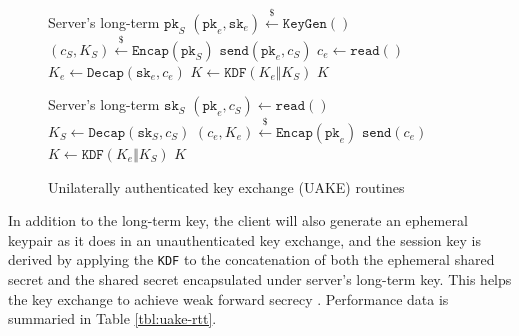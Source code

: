 \documentclass[journal=tches,submission]{iacrtrans}
\newcommand{\keygen}{\texttt{KeyGen}}
\newcommand{\encap}{\texttt{Encap}}
\newcommand{\decap}{\texttt{Decap}}
\newcommand{\pk}{\texttt{pk}}
\newcommand{\sk}{\texttt{sk}}
\newcommand{\leftsample}{\stackrel{\$}{\leftarrow}}
\begin{document}
\begin{figure}[h]
    \centering
    \begin{minipage}[b]{0.49\textwidth}
        \begin{algorithm}[H]
            \caption*{$\texttt{UAKE}_\texttt{C}(\pk_S)$}
            \begin{algorithmic}[1]
                \Require Server's long-term $\pk_S$
                \State $(\pk_e, \sk_e) \leftsample \keygen()$
                \State $(c_S, K_S) \leftsample \encap(\pk_S)$
                \State $\texttt{send}(\pk_e, c_S)$
                \State $c_e \leftarrow \texttt{read}()$
                \State $K_e \leftarrow \decap(\sk_e, c_e)$
                \State $K \leftarrow \texttt{KDF}(K_e \Vert K_S)$
                \State \Return $K$
            \end{algorithmic}
        \end{algorithm}
    \end{minipage}\hfill
    \begin{minipage}[b]{0.49\textwidth}
        \begin{algorithm}[H]
            \caption*{$\texttt{UAKE}_\texttt{S}(\sk_S)$}
            \begin{algorithmic}[1]
                \Require Server's long-term $\sk_S$
                \State $(\pk_e, c_S) \leftarrow \texttt{read}()$
                \State $K_S \leftarrow \decap(\sk_S, c_S)$
                \State $(c_e, K_e) \leftsample \encap(\pk_e)$
                \State $\texttt{send}(c_e)$
                \State $K \leftarrow \texttt{KDF}(K_e \Vert K_S)$
                \State \Return $K$
            \end{algorithmic}
        \end{algorithm}
    \end{minipage}

    \caption{Unilaterally authenticated key exchange (UAKE) routines}\label{fig:uake-routines}
\end{figure}

In addition to the long-term key, the client will also generate an ephemeral keypair as it does in an unauthenticated key exchange, and the session key is derived by applying the \texttt{KDF} to the concatenation of both the ephemeral shared secret and the shared secret encapsulated under server's long-term key. This helps the key exchange to achieve weak forward secrecy \cite{DBLP:conf/eurocrypt/CanettiK01}. Performance data is summaried in Table \ref{tbl:uake-rtt}.
\end{document}
